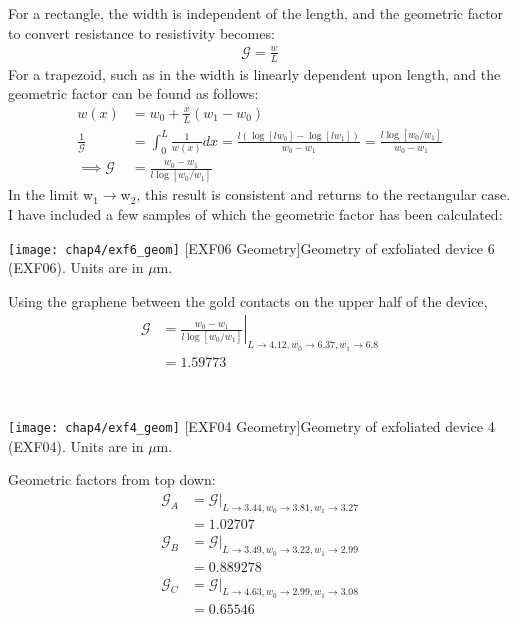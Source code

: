 \documentclass[../Matt_Gebert_Honours_Thesis.tex]{subfiles}
\begin{document}
For a rectangle, the width is independent of the length, and the geometric factor to convert resistance to resistivity becomes:
\begin{align}
\mathcal{G} = \frac{w}{L}
\end{align}
For a trapezoid, such as in  the width is linearly dependent upon length, and the geometric factor can be found as follows:
\begin{align}
	w(x) &= w_0 + \frac{x}{L}(w_1 - w_0)\\
	\frac{1}{\mathcal{G}} &= \int_{0}^{L}\frac{1}{w(x)}dx = \frac{l \left(\log\left[l w_0\right] - \log\left[l w_1\right]\right)}{w_0-w_1} = \frac{l \log\left[w_0/w_1\right]}{w_0-w_1}\\
	\implies \mathcal{G} &= \frac{w_0-w_1}{l \log\left[w_0 / w_1\right]}
\end{align}
In the limit w$_1\to$w$_2$, this result is consistent and returns to the rectangular case. I have included a few samples of which the geometric factor has been calculated:\\\newline
\begin{minipage}{0.5\textwidth}
	\centering
	\texttt{[image: chap4/exf6\_geom]}
	[EXF06 Geometry]{Geometry of exfoliated device 6 (EXF06). Units are in $\mu$m.}
\end{minipage}
\begin{minipage}{0.5\textwidth}
	\centering
	Using the graphene between the gold contacts on the upper half of the device, 
	\begin{align*}
		\mathcal{G} &= \left.\frac{w_0-w_1}{l \log\left[w_0 / w_1\right]}\right|_{L\to 4.12, w_0\to 6.37, w_1\to 6.8}\\ &= 1.59773
	\end{align*}
\end{minipage}\\\newline\hspace{0.5cm}
\begin{minipage}{0.5\textwidth}
	\centering
	\texttt{[image: chap4/exf4\_geom]}
	[EXF04 Geometry]{Geometry of exfoliated device 4 (EXF04). Units are in $\mu$m.}
\end{minipage}
\begin{minipage}{0.5\textwidth}
	\centering
	Geometric factors from top down: 
	\begin{align*}
	\mathcal{G}_A &= \mathcal{G}|_{L\to 3.44, w_0\to 3.81, w_1\to 3.27}\\ &= 1.02707\\
	\mathcal{G}_B &= \mathcal{G}|_{L\to 3.49, w_0\to 3.22, w_1\to 2.99}\\ &= 0.889278\\
	\mathcal{G}_C &= \mathcal{G}|_{L\to 4.63, w_0\to 2.99, w_1\to 3.08}\\ &= 0.65546\\
	\end{align*}
\end{minipage}\\\newline
\end{document}
